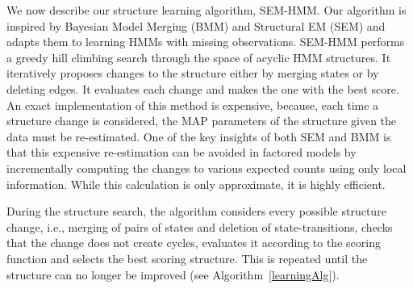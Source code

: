 \documentclass[letterpaper]{article}
\begin{document}
We now describe our structure learning algorithm, SEM-HMM.  Our algorithm is inspired by Bayesian Model Merging (BMM) \cite{stolcke1994best} and Structural EM (SEM) \cite{friedman1998bayesian} and adapts them to learning HMMs with missing observations.
SEM-HMM performs a greedy hill climbing search through the space of acyclic 
HMM structures. It iteratively proposes changes to the structure either 
by merging states or by deleting edges. It evaluates each change and makes the one with the best score. 
An exact implementation of this method is expensive, because, each time a structure change is considered, the MAP parameters of the structure given the data must be re-estimated.
One of the key insights of both SEM and BMM is that this expensive 
re-estimation can be avoided in factored models by incrementally 
computing the changes to various expected counts using only local 
information. While this calculation is only approximate, it is highly 
efficient. 


During the structure search, the algorithm considers every possible structure change, i.e., merging of pairs of states and deletion of state-transitions, checks that the change does not create cycles, evaluates it according to the scoring function and selects the best scoring structure. This is repeated until the structure can no longer be improved (see Algorithm~\ref{learningAlg}).
\end{document}
